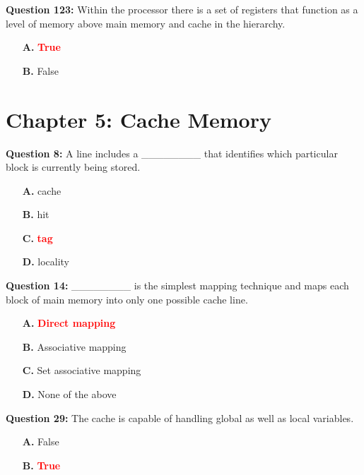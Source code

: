 \documentclass[12pt,a4paper]{article}
\begin{document}
\textbf{Question 123:} Within the processor there is a set of registers that function as a level of memory above main memory and cache in the hierarchy.

\begin{itemize}
    \item[\textbf{A.}] \textcolor{red}{\textbf{True}}
    \item[\textbf{B.}] False
\end{itemize}

\vspace{0.5cm}

\section{Chapter 5: Cache Memory}

\textbf{Question 8:} A line includes a ________ that identifies which particular block is currently being stored.

\begin{itemize}
    \item[\textbf{A.}] cache
    \item[\textbf{B.}] hit
    \item[\textbf{C.}] \textcolor{red}{\textbf{tag}}
    \item[\textbf{D.}] locality
\end{itemize}

\vspace{0.5cm}

\textbf{Question 14:} ________ is the simplest mapping technique and maps each block of main memory into only one possible cache line.

\begin{itemize}
    \item[\textbf{A.}] \textcolor{red}{\textbf{Direct mapping}}
    \item[\textbf{B.}] Associative mapping
    \item[\textbf{C.}] Set associative mapping
    \item[\textbf{D.}] None of the above
\end{itemize}

\vspace{0.5cm}

\textbf{Question 29:} The cache is capable of handling global as well as local variables.

\begin{itemize}
    \item[\textbf{A.}] False
    \item[\textbf{B.}] \textcolor{red}{\textbf{True}}
\end{itemize}
\end{document}
